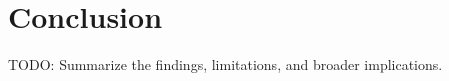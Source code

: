 \section{Conclusion}
\label{sec:conclusion}

TODO: Summarize the findings, limitations, and broader implications.
